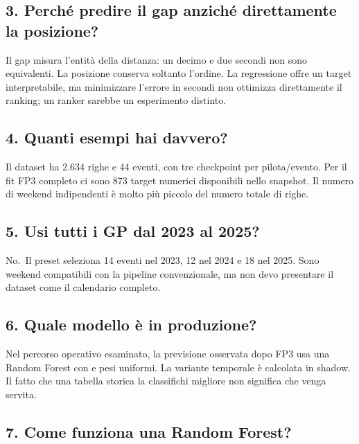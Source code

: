 \documentclass[11pt,a4paper]{article}
\newcommand{\code}[1]{{\ttfamily\small\seqsplit{#1}}}
\begin{document}
\subsection{3. Perché predire il gap anziché direttamente la posizione?}\label{perchuxe9-predire-il-gap-anzichuxe9-direttamente-la-posizione}

Il gap misura l'entità della distanza: un decimo e due secondi non sono equivalenti. La posizione conserva soltanto l'ordine. La regressione offre un target interpretabile, ma minimizzare l'errore in secondi non ottimizza direttamente il ranking; un ranker sarebbe un esperimento distinto.

\subsection{4. Quanti esempi hai davvero?}\label{quanti-esempi-hai-davvero}

Il dataset ha 2.634 righe e 44 eventi, con tre checkpoint per pilota/evento. Per il fit FP3 completo ci sono 873 target numerici disponibili nello snapshot. Il numero di weekend indipendenti è molto più piccolo del numero totale di righe.

\subsection{5. Usi tutti i GP dal 2023 al 2025?}\label{usi-tutti-i-gp-dal-2023-al-2025}

No.~Il preset seleziona 14 eventi nel 2023, 12 nel 2024 e 18 nel 2025. Sono weekend compatibili con la pipeline convenzionale, ma non devo presentare il dataset come il calendario completo.

\subsection{6. Quale modello è in produzione?}\label{quale-modello-uxe8-in-produzione}

Nel percorso operativo esaminato, la previsione osservata dopo FP3 usa una Random Forest con \code{base\_plus\_relative} e pesi uniformi. La variante temporale è calcolata in shadow. Il fatto che una tabella storica la classifichi migliore non significa che venga servita.

\subsection{7. Come funziona una Random Forest?}\label{come-funziona-una-random-forest}
\end{document}
